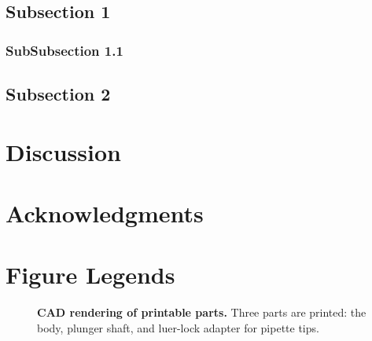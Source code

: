 \subsection*{Subsection 1}

\subsubsection*{SubSubsection 1.1}

\subsection*{Subsection 2}

\section*{Discussion}




\section*{Acknowledgments}





%
%
% 

\section*{Figure Legends}
%

\begin{figure}
\caption{
{\bf CAD rendering of printable parts.}  Three parts are printed: the body, plunger shaft, and luer-lock adapter for pipette tips.
}
\label{CAD-render-figure}
\end{figure}

